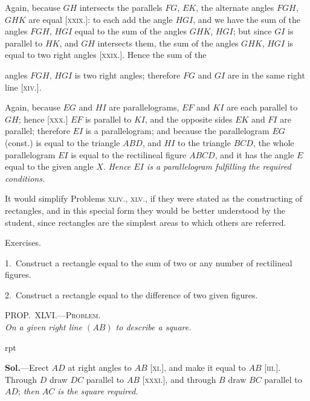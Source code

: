 \documentclass[oneside]{book}
\newcounter{wrapwidth}
\newcommand\myprop[2]{
\bigskip\Needspace*{4\baselineskip}\begin{center}\textsc{#1}\\\medskip\emph{#2}\par\end{center}
}
\newcommand\exhead[1]{
\Needspace*{5\baselineskip}\begin{center}
\textsf{#1}
\end{center}
}
\newcommand\imgflow[3]{
\setcounter{wrapwidth}{#1}

\begin{wrapfigure}[#2]{r}{\value{wrapwidth}pt}
\begin{center}
\vspace{-0.3in}

\end{center}
\end{wrapfigure}
}
\begin{document}
Again, because $GH$ intersects the parallels $FG$, $EK$,
the alternate angles $FGH$, $GHK$ are equal [\textsc{xxix.}]: to
each add the angle $HGI$, and we have the sum of the
angles $FGH$, $HGI$ equal to the sum of the angles $GHK$,
$HGI$; but since $GI$ is parallel to $HK$, and $GH$ intersects
them, the sum of the angles $GHK$, $HGI$ is equal
to two right angles [\textsc{xxix.}]. Hence the sum of the

angles $FGH$, $HGI$ is two right angles; therefore $FG$
and $GI$ are in the same right line [\textsc{xiv}.].

Again, because $EG$ and $HI$ are parallelograms, $EF$
and $KI$ are each parallel to $GH$; hence [\textsc{xxx}.] $EF$ is
parallel to $KI$, and the opposite sides $EK$ and $FI$ are
parallel; therefore $EI$ is a parallelogram; and because
the parallelogram $EG$ (const.) is equal to the triangle
$ABD$, and $HI$ to the triangle $BCD$, the whole parallelogram
$EI$ is equal to the rectilineal figure $ABCD$, and
it has the angle $E$ equal to the given angle $X$. \emph{Hence
$EI$ is a parallelogram fulfilling the required conditions.}\par\medskip

\begin{footnotesize}
It would simplify Problems \textsc{xliv}., \textsc{xlv}., if they were stated as
the constructing of rectangles, and in this special form they
would be better understood by the student, since rectangles are
the simplest areas to which others are referred.
\par\end{footnotesize}


\exhead{Exercises.}

\begin{footnotesize}
1.~Construct a rectangle equal to the sum of two or any
number of rectilineal figures.

2.~Construct a rectangle equal to the difference of two given
figures.
\par\end{footnotesize}


\myprop{PROP\@.~XLVI\@.---Problem.}{On a given right line $(AB)$ to describe a square.}


\imgflow{90}{9}{f255}

\textbf{Sol.}---Erect $AD$ at right angles to $AB$ [\textsc{xi}.], and
make it equal to $AB$ [\textsc{iii}.]. Through
$D$ draw $DC$ parallel to $AB$ [\textsc{xxxi}.],
and through $B$ draw $BC$ parallel to
$AD$; \emph{then $AC$ is the square required.}
\end{document}
